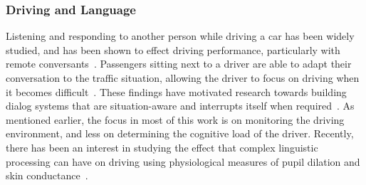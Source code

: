 \subsubsection{Driving and Language}
Listening and responding to another person while driving a car has been widely studied, and has been shown to effect driving performance, particularly with remote conversants~\cite{kubose2006}. Passengers sitting next to a driver are able to adapt their conversation to the traffic situation, allowing the driver to focus on driving when it becomes difficult~\cite{drews2008, cohen2014}. These findings have motivated research towards building dialog systems that are situation-aware and interrupts itself when required~\cite{kousidis2014}. As mentioned earlier, the focus in most of this work is on monitoring the driving environment, and less on determining the cognitive load of the driver. Recently, there has been an interest in studying the effect that complex linguistic processing can have on driving using physiological measures of pupil dilation and skin conductance~\cite{demberg2013}. 

